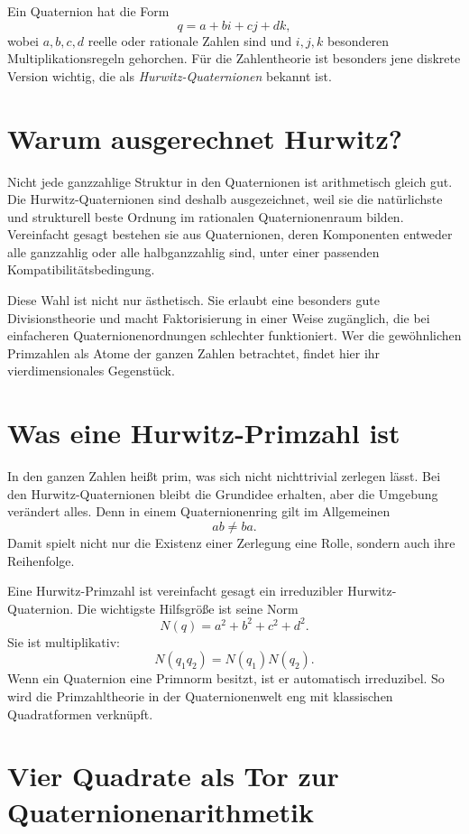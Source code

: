 \documentclass[11pt,a4paper]{article}
\begin{document}
	Ein Quaternion hat die Form
	\[
	q=a+bi+cj+dk,
	\]
	wobei \(a,b,c,d\) reelle oder rationale Zahlen sind und \(i,j,k\) besonderen Multiplikationsregeln gehorchen. Für die Zahlentheorie ist besonders jene diskrete Version wichtig, die als \emph{Hurwitz-Quaternionen} bekannt ist.
	
	\section*{Warum ausgerechnet Hurwitz?}
	
	Nicht jede ganzzahlige Struktur in den Quaternionen ist arithmetisch gleich gut. Die Hurwitz-Quaternionen sind deshalb ausgezeichnet, weil sie die natürlichste und strukturell beste Ordnung im rationalen Quaternionenraum bilden. Vereinfacht gesagt bestehen sie aus Quaternionen, deren Komponenten entweder alle ganzzahlig oder alle halbganzzahlig sind, unter einer passenden Kompatibilitätsbedingung.
	
	Diese Wahl ist nicht nur ästhetisch. Sie erlaubt eine besonders gute Divisionstheorie und macht Faktorisierung in einer Weise zugänglich, die bei einfacheren Quaternionenordnungen schlechter funktioniert. Wer die gewöhnlichen Primzahlen als Atome der ganzen Zahlen betrachtet, findet hier ihr vierdimensionales Gegenstück.
	
	\section*{Was eine Hurwitz-Primzahl ist}
	
	In den ganzen Zahlen heißt prim, was sich nicht nichttrivial zerlegen lässt. Bei den Hurwitz-Quaternionen bleibt die Grundidee erhalten, aber die Umgebung verändert alles. Denn in einem Quaternionenring gilt im Allgemeinen
	\[
	ab\neq ba.
	\]
	Damit spielt nicht nur die Existenz einer Zerlegung eine Rolle, sondern auch ihre Reihenfolge.
	
	Eine Hurwitz-Primzahl ist vereinfacht gesagt ein irreduzibler Hurwitz-Quaternion. Die wichtigste Hilfsgröße ist seine Norm
	\[
	N(q)=a^2+b^2+c^2+d^2.
	\]
	Sie ist multiplikativ:
	\[
	N(q_1q_2)=N(q_1)N(q_2).
	\]
	Wenn ein Quaternion eine Primnorm besitzt, ist er automatisch irreduzibel. So wird die Primzahltheorie in der Quaternionenwelt eng mit klassischen Quadratformen verknüpft.
	
	\section*{Vier Quadrate als Tor zur Quaternionenarithmetik}
	
\end{document}
